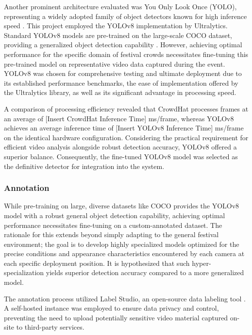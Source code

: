 Another prominent architecture evaluated was You Only Look Once (YOLO), representing a widely adopted family of object detectors known for high inference speed \cite{yolo}. This project employed the YOLOv8 implementation by Ultralytics. Standard YOLOv8 models are pre-trained on the large-scale COCO dataset, providing a generalized object detection capability \cite{ultralytics} \cite{coco}. However, achieving optimal performance for the specific domain of festival crowds necessitates fine-tuning this pre-trained model on representative video data captured during the event. YOLOv8 was chosen for comprehensive testing and ultimate deployment due to its established performance benchmarks, the ease of implementation offered by the Ultralytics library, as well as its significant advantage in processing speed.

A comparison of processing efficiency revealed that CrowdHat processes frames at an average of [Insert CrowdHat Inference Time] ms/frame, whereas YOLOv8 achieves an average inference time of [Insert YOLOv8 Inference Time] ms/frame on the identical hardware configuration. Considering the practical requirement for efficient video analysis alongside robust detection accuracy, YOLOv8 offered a superior balance. Consequently, the fine-tuned YOLOv8 model was selected as the definitive detector for integration into the system.



\subsubsection{Annotation}

While pre-training on large, diverse datasets like COCO provides the YOLOv8 model with a robust general object detection capability, achieving optimal performance necessitates fine-tuning on a custom-annotated dataset. The rationale for this extends beyond simply adapting to the general festival environment; the goal is to develop highly specialized models optimized for the precise conditions and appearance characteristics encountered by each camera at each specific deployment position. It is hypothesized that such hyper-specialization yields superior detection accuracy compared to a more generalized model.


The annotation process utilized Label Studio, an open-source data labeling tool \cite{label_studio}. A self-hosted instance was employed to ensure data privacy and control, preventing the need to upload potentially sensitive video material captured on-site to third-party services.

